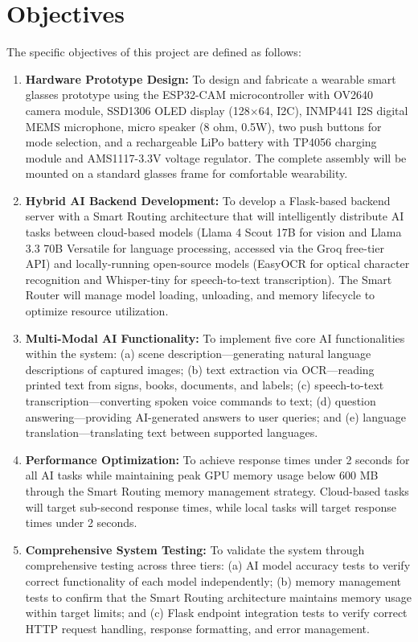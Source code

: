 \section{Objectives}
The specific objectives of this project are defined as follows:

\begin{enumerate}[leftmargin=1.5cm]
\item \textbf{Hardware Prototype Design:} To design and fabricate a wearable smart glasses prototype using the ESP32-CAM microcontroller with OV2640 camera module, SSD1306 OLED display (128$\times$64, I2C), INMP441 I2S digital MEMS microphone, micro speaker (8 ohm, 0.5W), two push buttons for mode selection, and a rechargeable LiPo battery with TP4056 charging module and AMS1117-3.3V voltage regulator. The complete assembly will be mounted on a standard glasses frame for comfortable wearability.

\item \textbf{Hybrid AI Backend Development:} To develop a Flask-based backend server with a Smart Routing architecture that will intelligently distribute AI tasks between cloud-based models (Llama 4 Scout 17B for vision and Llama 3.3 70B Versatile for language processing, accessed via the Groq free-tier API) and locally-running open-source models (EasyOCR for optical character recognition and Whisper-tiny for speech-to-text transcription). The Smart Router will manage model loading, unloading, and memory lifecycle to optimize resource utilization.

\item \textbf{Multi-Modal AI Functionality:} To implement five core AI functionalities within the system: (a) scene description---generating natural language descriptions of captured images; (b) text extraction via OCR---reading printed text from signs, books, documents, and labels; (c) speech-to-text transcription---converting spoken voice commands to text; (d) question answering---providing AI-generated answers to user queries; and (e) language translation---translating text between supported languages.

\item \textbf{Performance Optimization:} To achieve response times under 2 seconds for all AI tasks while maintaining peak GPU memory usage below 600 MB through the Smart Routing memory management strategy. Cloud-based tasks will target sub-second response times, while local tasks will target response times under 2 seconds.

\item \textbf{Comprehensive System Testing:} To validate the system through comprehensive testing across three tiers: (a) AI model accuracy tests to verify correct functionality of each model independently; (b) memory management tests to confirm that the Smart Routing architecture maintains memory usage within target limits; and (c) Flask endpoint integration tests to verify correct HTTP request handling, response formatting, and error management.


\end{enumerate}

